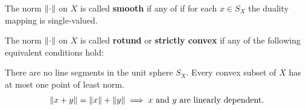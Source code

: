 \begin{definition}\label{def:smooth_norm}\cite[definition 2.36]{Phelps1993}
  The norm \( \left\Vert \cdot \right\Vert \) on \( X \) is called \textbf{smooth} if any of  if for each \( x \in S_X \) the duality mapping is single-valued.
\end{definition}

\begin{definition}\label{def:rotund_norm}\cite[definition 2.36]{Phelps1993}
  The norm \( \left\Vert \cdot \right\Vert \) on \( X \) is called \textbf{rotund} or \textbf{strictly convex} if any of the following equivalent conditions hold:
  \begin{defenum}
     There are no line segments in the unit sphere \( S_X \).
     Every convex subset of \( X \) has at most one point of least norm.
    \begin{align}\label{def:rotund_norm/linearly_dependent/equation}
      \left\Vert x + y \right\Vert = \left\Vert x \right\Vert + \left\Vert y \right\Vert \implies x \text{ and } y \text{ are linearly dependent}.
    \end{align}
  \end{defenum}
\end{definition}
